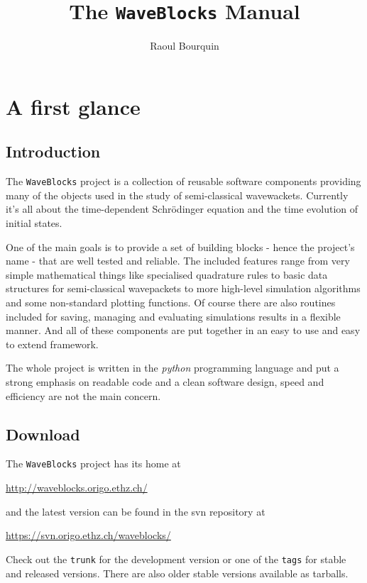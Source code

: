 \documentclass[a4paper,10pt]{report}
\title{The \texttt{WaveBlocks} Manual}
\author{Raoul Bourquin}
\begin{document}
\maketitle


\tableofcontents

\chapter{A first glance}

\section{Introduction}

The \texttt{WaveBlocks} project is a collection of reusable software components
providing many of the objects used in the study of semi-classical wavewackets.
Currently it's all about the time-dependent Schrödinger equation and the time
evolution of initial states.

One of the main goals is to provide a set of building blocks - hence the project's
name - that are well tested and reliable. The included features range from very
simple mathematical things like specialised quadrature rules to basic data
structures for semi-classical wavepackets to more high-level simulation algorithms
and some non-standard plotting functions. Of course there are also routines
included for saving, managing and evaluating simulations results in a flexible
manner. And all of these components are put together in an easy to use and easy
to extend framework.

The whole project is written in the \emph{python} programming language and put
a strong emphasis on readable code and a clean software design, speed and
efficiency are not the main concern.

\section{Download}

The \texttt{WaveBlocks} project has its home at
\begin{center}
  \url{http://waveblocks.origo.ethz.ch/}
\end{center}
and the latest version can be found in the svn repository at
\begin{center}
  \url{https://svn.origo.ethz.ch/waveblocks/}
\end{center}
Check out the \texttt{trunk} for the development version or
one of the \texttt{tags} for stable and released versions.
There are also older stable versions available as tarballs.
\end{document}
